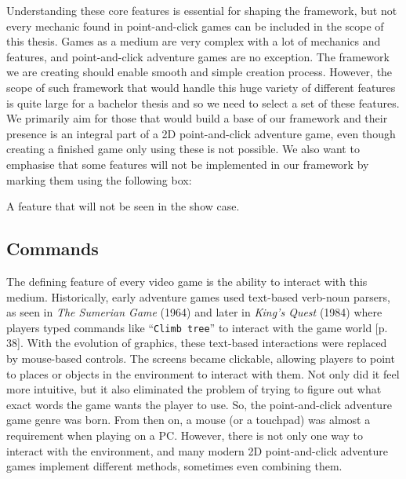 Understanding these core features is essential for shaping the framework, but not every mechanic found in point-and-click games can be included in the scope of this thesis. Games as a medium are very complex with a lot of mechanics and features, and point-and-click adventure games are no exception. The framework we are creating should enable smooth and simple creation process. However, the scope of such framework that would handle this huge variety of different features is quite large for a bachelor thesis and so we need to select a set of these features. We primarily aim for those that would build a base of our framework and their presence is an integral part of a 2D point-and-click adventure game, even though creating a finished game only using these is not possible. We also want to emphasise that some features will not be implemented in our framework by marking them using the following box:


\begin{notImplemented}
 \par
\vspace{3mm}
A feature that will not be seen in the show case.
\end{notImplemented}

\subsection{Commands}
\label{sec:Commands}
The defining feature of every video game is the ability to interact with this medium. Historically, early adventure games used text-based verb-noun parsers, as seen in \textit{The Sumerian Game} (1964) and later in \textit{King's Quest} (1984) where players typed commands like “\texttt{Climb tree}” to interact with the game world \cite{Salter2014}[p. 38]. With the evolution of graphics, these text-based interactions were replaced by mouse-based controls. The screens
became clickable, allowing players to point to places or objects in the environment to interact with them.  Not only did it feel more intuitive, but it also eliminated the problem of trying to figure out what exact words the game wants the player to use. So, the point-and-click adventure game genre was born. From then on, a mouse (or a touchpad) was almost a requirement when playing on a PC. However, there is not only one way to interact with the environment, and many modern 2D point-and-click adventure games implement different methods, sometimes even combining them.

